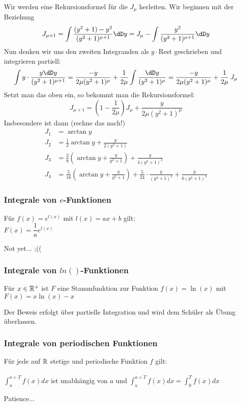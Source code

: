 Wir werden eine Rekursionsformel für die $J_\mu$ herleiten. Wir beginnen mit
der Beziehung
\[
J_{\mu+1}=\int\frac{(y^2+1)-y^2}{(y^2+1)^{\mu+1}}\dD y
=J_\mu-\int\frac{y^2}{(y^2+1)^{\mu+1}}\dD y
\]
Nun denken wir uns den zweiten Integranden als $y\cdot$Rest geschrieben und
integrieren partiell:
\[
\int y\cdot\frac{y\dD y}{(y^2+1)^{\mu+1}}=
\frac{-y}{2\mu(y^2+1)^\mu}+\frac{1}{2\mu}\int\frac{\dD y}{(y^2+1)^\mu}=
\frac{-y}{2\mu(y^2+1)^\mu}+\frac{1}{2\mu}\,J_\mu
\]
Setzt man das oben ein, so bekommt man die Rekursionsformel:
\begin{equation}
  \label{eq:71}
  J_{\mu+1}=\left(1-\frac{1}{2\mu}\right)J_\mu+\frac{y}{2\mu(y^2+1)^\mu}
\end{equation}
Insbesondere ist dann (rechne das nach!)
\begin{align*}
  J_1&=\arctan y\\
  J_2&=\frac{1}{2}\arctan y+\frac{y}{2(y^2+1)}\\
  J_3&=\frac38\left(\arctan y+\frac{y}{y^2+1}\right)+\frac{y}{4(y^2+1)^2}\\
  J_4&=\frac{5}{16}\left(\arctan y+\frac{y}{y^2+1}\right)+
       \frac{5}{24}\cdot\frac{y}{(y^2+1)^2}+\frac{y}{6(y^2+1)^3}
\end{align*}
\subsubsection{Integrale von $e$-Funktionen}
\begin{Theorem}
  Für $f(x)=e^{l(x)}$ mit $l(x) = ax+b$ gilt:\\
  $F(x) = \dfrac{1}{a}e^{l(x)}$
\end{Theorem}
\begin{Beweis}
  Not yet... ;((
\end{Beweis}
\subsubsection{Integrale von $ln()$-Funktionen}
\begin{Theorem}
  Für $x \in \mathbb{R}^{+}$ ist $F$ eine Stammfunktion zur Funktion $f(x) = \ln(x)$ mit $F(x) = x \ln(x)-x$
\end{Theorem}
\begin{Beweis}
  Der Beweis erfolgt über partielle Integration und wird dem Schüler als Übung überlassen.
\end{Beweis}
\subsubsection{Integrale von periodischen Funktionen}
\begin{Theorem}
  Für jede auf $\mathbb{R}$ stetige und periodische Funktion $f$ gilt:\\\\
  $\int_a^{a+T} f(x)dx$ ist unabhängig von $a$ und $\int_a^{a+T} f(x)dx = \int_0^{T} f(x)dx$
\end{Theorem}
\begin{Beweis}
  Patience...
\end{Beweis}

